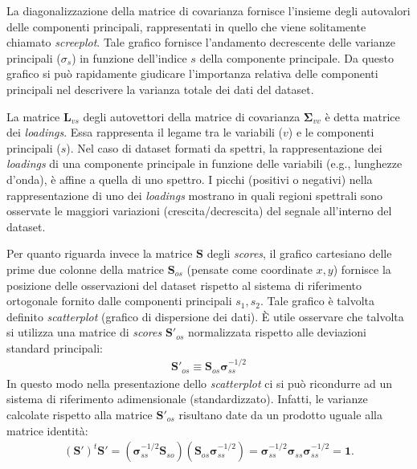 \documentclass[11pt]{amsart}
\begin{document}
La diagonalizzazione della matrice di covarianza fornisce l'insieme degli autovalori delle componenti principali, rappresentati in quello che viene solitamente chiamato {\it screeplot}. Tale grafico fornisce l'andamento decrescente delle varianze principali ($\sigma_s$) in funzione dell'indice $s$ della componente principale. Da questo grafico si può rapidamente giudicare l'importanza relativa delle componenti principali nel descrivere la varianza totale dei dati del dataset. 

La matrice $\bm L_{vs}$ degli autovettori della matrice di covarianza $\bm \Sigma_{vv}$ è detta matrice dei {\em loadings}. Essa rappresenta il legame tra le variabili ($v$) e le componenti principali ($s$). Nel caso di dataset formati da spettri, la rappresentazione dei {\em loadings} di una componente principale in funzione delle variabili (e.g., lunghezze d'onda), è affine a quella di uno spettro. I picchi (positivi o negativi) nella rappresentazione di uno dei {\em loadings} mostrano in quali regioni spettrali sono osservate le maggiori variazioni (crescita/decrescita) del segnale all'interno del dataset.

Per quanto riguarda invece la matrice $\bm S$ degli {\em scores}, il grafico cartesiano delle prime due colonne della matrice $\bm S_{os}$ (pensate come coordinate $x,y$) fornisce la posizione delle osservazioni del dataset rispetto al sistema di riferimento ortogonale fornito dalle componenti principali $s_1, s_2$. Tale grafico è talvolta definito {\em scatterplot} (grafico di dispersione dei dati).
È utile osservare che talvolta si utilizza una matrice di {\em scores} $\bm S'_{os}$ normalizzata rispetto alle deviazioni standard principali:
%
\begin{eqnarray}
\bm S'_{os} \equiv \bm S_{os} \bm \sigma_{ss}^{-1/2}
\end{eqnarray}
%
In questo modo nella presentazione dello {\em scatterplot} ci si può ricondurre ad un sistema di riferimento adimensionale (standardizzato). Infatti, le varianze calcolate rispetto alla matrice $\bm S'_{os}$ risultano date da un prodotto uguale alla matrice identità:
%
\begin{eqnarray}
(\bm S')^t \bm S' = 
%
\left( \bm \sigma_{ss}^{-1/2} \bm S_{so} \right) \left( \bm S_{os} \bm \sigma_{ss}^{-1/2} \right) =
%
\bm \sigma_{ss}^{-1/2} \bm \sigma_{ss} \bm \sigma_{ss}^{-1/2} = \bm 1.
\end{eqnarray}
\end{document}
